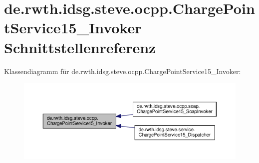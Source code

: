 \hypertarget{interfacede_1_1rwth_1_1idsg_1_1steve_1_1ocpp_1_1_charge_point_service15___invoker}{\section{de.\-rwth.\-idsg.\-steve.\-ocpp.\-Charge\-Point\-Service15\-\_\-\-Invoker Schnittstellenreferenz}
\label{interfacede_1_1rwth_1_1idsg_1_1steve_1_1ocpp_1_1_charge_point_service15___invoker}
}


Klassendiagramm für de.\-rwth.\-idsg.\-steve.\-ocpp.\-Charge\-Point\-Service15\-\_\-\-Invoker\-:\nopagebreak
\begin{figure}[H]
\begin{center}
\leavevmode
\includegraphics[width=350pt]{interfacede_1_1rwth_1_1idsg_1_1steve_1_1ocpp_1_1_charge_point_service15___invoker__inherit__graph}
\end{center}
\end{figure}
